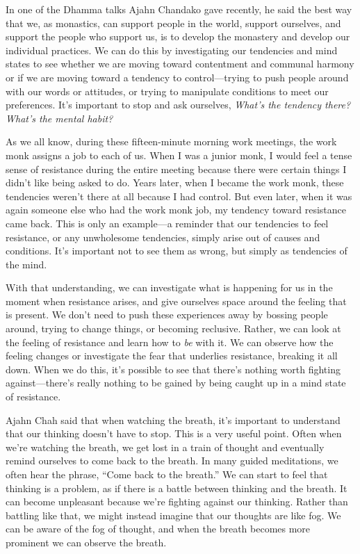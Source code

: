 
In one of the Dhamma talks Ajahn Chandako gave recently, he said the 
best way that we, as monastics, can support people in the world, 
support ourselves, and support the people who support us, is to develop 
the monastery and develop our individual practices. We can do this by 
investigating our tendencies and mind states to see whether we are 
moving toward contentment and communal harmony or if we are moving 
toward a tendency to control---trying to push people around with our 
words or attitudes, or trying to manipulate conditions to meet our 
preferences. It's important to stop and ask ourselves, \emph{What's the 
tendency there? What's the mental habit?}

As we all know, during these fifteen-minute morning work meetings, the 
work monk assigns a job to each of us. When I was a junior monk, I 
would feel a tense sense of resistance during the entire meeting 
because there were certain things I didn't like being asked to do. 
Years later, when I became the work monk, these tendencies weren't 
there at all because I had control. But even later, when it was again 
someone else who had the work monk job, my tendency toward resistance 
came back. This is only an example---a reminder that our tendencies to 
feel resistance, or any unwholesome tendencies, simply arise out of 
causes and conditions. It's important not to see them as wrong, but 
simply as tendencies of the mind.

With that understanding, we can investigate what is happening for us in 
the moment when resistance arises, and give ourselves space around the 
feeling that is present. We don't need to push these experiences away 
by bossing people around, trying to change things, or becoming 
reclusive. Rather, we can look at the feeling of resistance and learn 
how to \emph{be} with it. We can observe how the feeling changes or 
investigate the fear that underlies resistance, breaking it all down. 
When we do this, it's possible to see that there's nothing worth 
fighting against---there's really nothing to be gained by being caught 
up in a mind state of resistance.


Ajahn Chah said that when watching the breath, it's important to 
understand that our thinking doesn't have to stop. This is a very 
useful point. Often when we're watching the breath, we get lost in a 
train of thought and eventually remind ourselves to come back to the 
breath. In many guided meditations, we often hear the phrase, ``Come 
back to the breath.'' We can start to feel that thinking is a problem, 
as if there is a battle between thinking and the breath. It can become 
unpleasant because we're fighting against our thinking. Rather than 
battling like that, we might instead imagine that our thoughts are like 
fog. We can be aware of the fog of thought, and when the breath becomes 
more prominent we can observe the breath.

